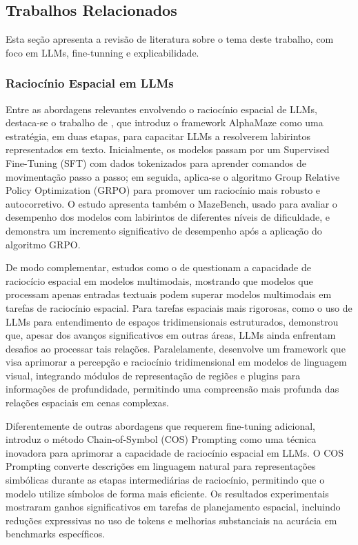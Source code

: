 \subsection{Trabalhos Relacionados}

Esta seção apresenta a revisão de literatura sobre o tema deste trabalho, com foco em LLMs, fine-tunning e explicabilidade.

\subsubsection{Raciocínio Espacial em LLMs}

Entre as abordagens relevantes envolvendo o raciocínio espacial de LLMs, destaca-se o trabalho de \cite{dao2025alphamaze}, que introduz o framework AlphaMaze como uma estratégia, em duas etapas, para capacitar LLMs a resolverem labirintos representados em texto. Inicialmente, os modelos passam por um Supervised Fine-Tuning (SFT) com dados tokenizados para aprender comandos de movimentação passo a passo; em seguida, aplica-se o algoritmo Group Relative Policy Optimization (GRPO) para promover um raciocínio mais robusto e autocorretivo. O estudo apresenta também o MazeBench, usado para avaliar o desempenho dos modelos com labirintos de diferentes níveis de dificuldade, e demonstra um incremento significativo de desempenho após a aplicação do algoritmo GRPO.

De modo complementar, estudos como o de \cite{jiang2024supervised} questionam a capacidade de raciocício espacial em modelos multimodais, mostrando que modelos que processam apenas entradas textuais podem superar modelos multimodais em tarefas de raciocínio espacial. Para tarefas espaciais mais rigorosas, como o uso de LLMs para entendimento de espaços tridimensionais estruturados, \cite{zhang2025point} demonstrou que, apesar dos avanços significativos em outras áreas, LLMs ainda enfrentam desafios ao processar tais relações. Paralelamente, \cite{cheng2024spatialrgpt} desenvolve um framework que visa aprimorar a percepção e raciocínio tridimensional em modelos de linguagem visual, integrando módulos de representação de regiões e plugins para informações de profundidade, permitindo uma compreensão mais profunda das relações espaciais em cenas complexas.

Diferentemente de outras abordagens que requerem fine-tuning adicional, \cite{hu2023chain} introduz o método Chain-of-Symbol (COS) Prompting como uma técnica inovadora para aprimorar a capacidade de raciocínio espacial em LLMs. O COS Prompting converte descrições em linguagem natural para representações simbólicas durante as etapas intermediárias de raciocínio, permitindo que o modelo utilize símbolos de forma mais eficiente. Os resultados experimentais mostraram ganhos significativos em tarefas de planejamento espacial, incluindo reduções expressivas no uso de tokens e melhorias substanciais na acurácia em benchmarks específicos.

